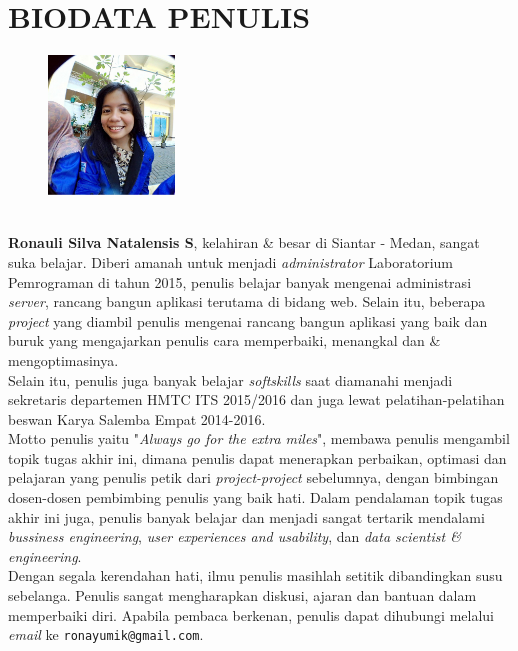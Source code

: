 \chapter{BIODATA PENULIS}
		\begin{figure}
			\includegraphics[width=0.3\textwidth]{images/foto-diri.png}
		\end{figure}
		\textbf{\ \\Ronauli Silva Natalensis S}, kelahiran \& besar di Siantar - Medan, sangat suka belajar. Diberi amanah untuk menjadi \textit{administrator} Laboratorium Pemrograman di tahun 2015, penulis belajar banyak mengenai administrasi \textit{server}, rancang bangun aplikasi terutama di bidang web. Selain itu, beberapa \textit{project} yang diambil penulis mengenai rancang bangun aplikasi yang baik dan buruk yang mengajarkan penulis cara memperbaiki, menangkal dan \& mengoptimasinya.\\
		Selain itu, penulis juga banyak belajar \textit{softskills} saat diamanahi menjadi sekretaris departemen HMTC ITS 2015/2016 dan juga lewat pelatihan-pelatihan beswan Karya Salemba Empat 2014-2016.\\
		\indent Motto penulis yaitu "\textit{Always go for the extra miles}", membawa penulis mengambil topik tugas akhir ini, dimana penulis dapat menerapkan perbaikan, optimasi dan pelajaran yang penulis petik dari \textit{project-project} sebelumnya, dengan bimbingan dosen-dosen pembimbing penulis yang baik hati. Dalam pendalaman topik tugas akhir ini juga, penulis banyak belajar dan menjadi sangat tertarik mendalami \textit{bussiness engineering}, \textit{user experiences and usability}, dan \textit{data scientist \& engineering}. \\
		\indent Dengan segala kerendahan hati, ilmu penulis masihlah setitik dibandingkan susu sebelanga. Penulis sangat mengharapkan diskusi, ajaran dan bantuan dalam memperbaiki diri. Apabila pembaca berkenan, penulis dapat dihubungi melalui \textit{email} ke \texttt{ronayumik@gmail.com}.


